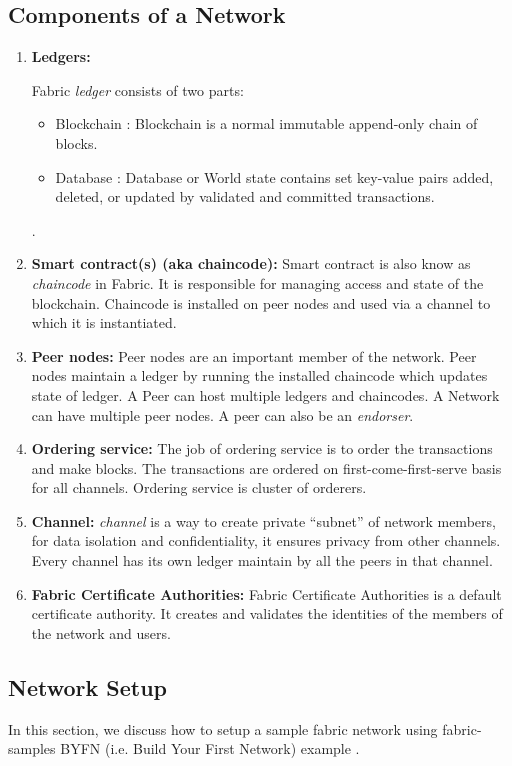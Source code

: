 \subsection{Components of a Network\cite{fabric_glossary}}
\begin{enumerate}
    \item \textbf{Ledgers:\label{subsub:ledger}}
    
     Fabric \textit{ledger} consists of two parts:
     \begin{itemize}
         \item Blockchain : Blockchain is a normal immutable append-only chain of blocks.
         \item Database : Database or World state contains set key-value pairs added, deleted, or updated by validated and committed transactions. 
     \end{itemize}.  

\item \textbf{Smart contract(s) (aka chaincode):}
Smart contract is also know as \textit{chaincode} in Fabric. It is responsible for managing access and state of the blockchain. Chaincode is installed on peer nodes and used via a channel to which it is instantiated.


\item \textbf{Peer nodes:}
Peer nodes are an important member of the network. Peer nodes maintain a ledger by running the installed chaincode which updates state of ledger. A Peer can host multiple ledgers and chaincodes. A Network can have multiple peer nodes. A peer can also be an \textit{endorser}.
\item \textbf{Ordering service:}
The job of ordering service is to order the transactions and make blocks. The transactions are ordered on first-come-first-serve basis for all channels. Ordering service is cluster of orderers.
\item \textbf{Channel:}
\textit{channel} is a way to create  private “subnet” of network members, for data isolation and confidentiality, it ensures privacy from other channels. Every channel has its own ledger maintain by all the peers in that channel.

\item \textbf{Fabric Certificate Authorities:}
Fabric Certificate Authorities is a default certificate authority. It creates and validates the identities of the members of the network and users.
\end{enumerate}

\subsection{Network Setup }
In this section, we discuss how to setup a sample fabric  network using fabric-samples BYFN (i.e. Build Your First Network) example \cite{byfn}\cite{medium_byfn}.

